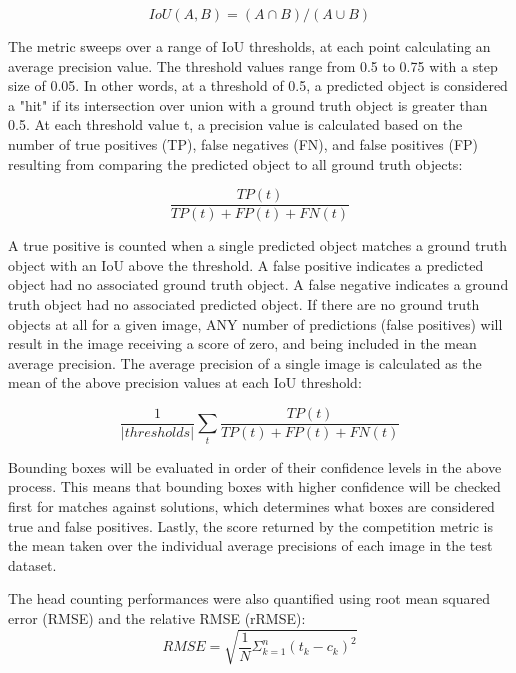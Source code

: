 \documentclass[utf8]{frontiersSCNS} %
\begin{document}
\begin{equation}
IoU(A,B) = (A\cap B)/(A\cup B)\label{eq:02}
\end{equation}

The metric sweeps over a range of IoU thresholds, at each point calculating an average precision value. The threshold values range from 0.5 to 0.75 with a step size of 0.05. In other words, at a threshold of 0.5, a predicted object is considered a "hit" if its intersection over union with a ground truth object is greater than 0.5.
At each threshold value t, a precision value is calculated based on the number of true positives (TP), false negatives (FN), and false positives (FP) resulting from comparing the predicted object to all ground truth objects:

\begin{equation}
\frac{TP(t)}{TP(t)+FP(t)+FN(t)}\label{eq:03}
\end{equation}

A true positive is counted when a single predicted object matches a ground truth object with an IoU above the threshold. A false positive indicates a predicted object had no associated ground truth object. A false negative indicates a ground truth object had no associated predicted object. If there are no ground truth objects at all for a given image, ANY number of predictions (false positives) will result in the image receiving a score of zero, and being included in the mean average precision.
The average precision of a single image is calculated as the mean of the above precision values at each IoU threshold:

\begin{equation}
\frac{1}{|thresholds|}\sum_{t}\frac{TP(t)}{TP(t)+FP(t)+FN(t)}\label{eq:04}
\end{equation}

Bounding boxes will be evaluated in order of their confidence levels in the above process. This means that bounding boxes with higher confidence will be checked first for matches against solutions, which determines what boxes are considered true and false positives. Lastly, the score returned by the competition metric is the mean taken over the individual average precisions of each image in the test dataset.

The head counting performances were also quantified using root mean squared error (RMSE) and the relative RMSE (rRMSE):
\begin{equation}
RMSE = \sqrt{\frac{1}{N}\Sigma_{k=1}^{n}(t_k-c_k)^2}\label{eq:05}
\end{equation}
\end{document}
